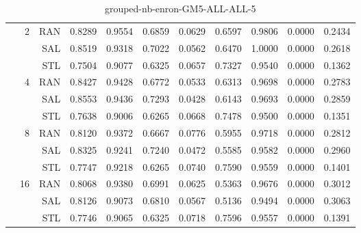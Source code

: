 \begin{center}
\begin{table}[htbp]
\begin{tabular}{ | r | r | r | r | r | r | r | r | r | r | r |}
 & \multirow{3}{*}{2} & RAN & 0.8289 & 0.9554 & 0.6859 & 0.0629 & 0.6597 & 0.9806 & 0.0000 & 0.2434\\ \cline{3-11}
 &   & SAL & 0.8519 & 0.9318 & 0.7022 & 0.0562 & 0.6470 & 1.0000 & 0.0000 & 0.2618\\ \cline{3-11}
 &   & STL & 0.7504 & 0.9077 & 0.6325 & 0.0657 & 0.7327 & 0.9540 & 0.0000 & 0.1362\\ \cline{2-11}
 & \multirow{3}{*}{4} & RAN & 0.8427 & 0.9428 & 0.6772 & 0.0533 & 0.6313 & 0.9698 & 0.0000 & 0.2783\\ \cline{3-11}
 &   & SAL & 0.8553 & 0.9436 & 0.7293 & 0.0428 & 0.6143 & 0.9693 & 0.0000 & 0.2859\\ \cline{3-11}
 &   & STL & 0.7638 & 0.9006 & 0.6265 & 0.0668 & 0.7478 & 0.9500 & 0.0000 & 0.1351\\ \cline{2-11}
 & \multirow{3}{*}{8} & RAN & 0.8120 & 0.9372 & 0.6667 & 0.0776 & 0.5955 & 0.9718 & 0.0000 & 0.2812\\ \cline{3-11}
 &   & SAL & 0.8325 & 0.9241 & 0.7240 & 0.0472 & 0.5585 & 0.9582 & 0.0000 & 0.2960\\ \cline{3-11}
 &   & STL & 0.7747 & 0.9218 & 0.6265 & 0.0740 & 0.7590 & 0.9559 & 0.0000 & 0.1401\\ \cline{2-11}
 & \multirow{3}{*}{16} & RAN & 0.8068 & 0.9380 & 0.6991 & 0.0625 & 0.5363 & 0.9676 & 0.0000 & 0.3012\\ \cline{3-11}
 &   & SAL & 0.8126 & 0.9073 & 0.6810 & 0.0567 & 0.5136 & 0.9494 & 0.0000 & 0.3063\\ \cline{3-11}
 &   & STL & 0.7746 & 0.9065 & 0.6325 & 0.0718 & 0.7596 & 0.9557 & 0.0000 & 0.1391\\ \cline{2-11}
\hline
\end{tabular}
\caption{grouped-nb-enron-GM5-ALL-ALL-5}
\end{table}
\end{center}

